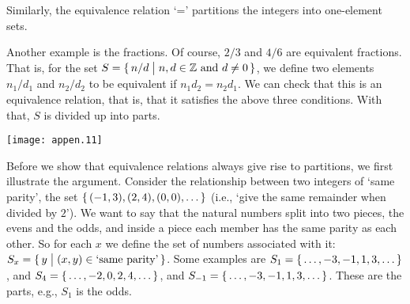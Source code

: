 Similarly, the equivalence relation `=' partitions the integers into
one-element sets.
%
%

Another example is the fractions.
Of course, $2/3$ and $4/6$ are equivalent fractions.
That is, for the set 
$S=\mbox{$\{\,n/d\bigm| \text{$n,d\in\mathbb{Z}$ and $d\neq 0$}\,\}$}$,
we define two elements $n_1/d_1$ and $n_2/d_2$ 
to be equivalent if $n_1d_2=n_2d_1$.
We can check that this is an equivalence relation, that is, that
it satisfies the above three conditions.
With that, $S$ is divided up into parts.
\begin{center}
  \texttt{[image: appen.11]}
\end{center}

Before we show that equivalence relations always give rise to
partitions, we first illustrate the argument.
Consider the relationship between two integers of `same parity', 
the set \( \mbox{$\{\, (-1,3),(2,4),(0,0),\ldots\,\}$} \)
(i.e., `give the same remainder when divided by \( 2 \)').
We want to say that the natural numbers split into two pieces,
the evens and the odds, and inside a piece each member has the same
parity as each other.
So for each \( x \) we define the set of numbers associated with
it: \( S_x=\set{y\suchthat (x,y)\in\text{`same\ parity'}} \).
Some examples are
\( S_1=\mbox{$\{\,\ldots,-3,-1,1,3,\ldots\,\}$} \), and
\( S_4=\mbox{$\{\,\ldots,-2,0,2,4,\ldots\,\}$} \), and
\( S_{-1}=\mbox{$\{\,\ldots,-3,-1,1,3,\ldots\,\}$} \).
These are the parts, e.g., \( S_1 \) is the odds.

